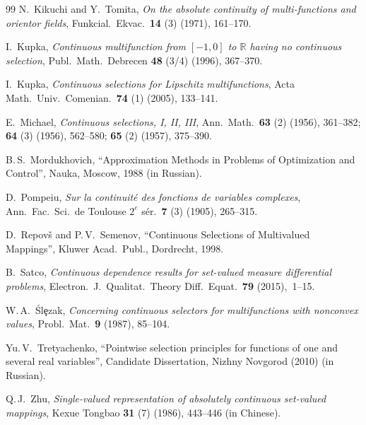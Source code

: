 \documentclass[preprint,12pt]{elsarticle}
\newcommand{\Rb}{\mathbb{R}}  \newcommand{\Nb}{\mathbb{N}}
\begin{document}
\begin{thebibliography}{99}
N.~Kikuchi and Y.~Tomita,
{\it On the absolute continuity of multi-functions and orientor fields},
Funkcial.\ Ekvac.\ {\bf 14} (3) (1971), 161--170.

I.~Kupka,
{\it Continuous multifunction from $[-1,0]$ to $\Rb$ having no continuous selection},
Publ.\ Math.\ Debrecen {\bf 48} (3/4) (1996), 367--370.

I.~Kupka,
{\it Continuous selections for Lipschitz multifunctions},
Acta Math.\ Univ.\ Comenian.\ {\bf 74} (1) (2005), 133--141.

E.~Michael, {\it Continuous selections, I, II, III},
Ann.\ Math.\ {\bf 63} (2) (1956), 361--382; {\bf 64} (3) (1956), 562--580;
  {\bf 65} (2) (1957), 375--390.

B.\,S.~Mordukhovich,
``Approximation Methods in Problems of Optimization and Control'',
Nauka, Moscow, 1988 (in Russian).

D.~Pompeiu,
{\it Sur la continuit{\'e} des fonctions de variables complexes},
Ann.\ Fac.\ Sci.\ de Toulouse $2^e$ s{\'e}r.\ {\bf 7} (3) (1905), 265--315.

D.~Repov{\v s} and P.\,V.~Semenov,
``Continuous Selections of Multivalued Mappings'',
Kluwer Acad.\ Publ., Dordrecht, 1998.

B.~Satco,
{\it Continuous dependence results for set-valued measure differential problems},
Electron.\ J.\ Qualitat.\ Theory Diff.\ Equat.\ {\bf 79} (2015),~1--15.

W.\,A.~{\'S}l{\c e}zak,
{\it Concerning continuous selectors for multifunctions with nonconvex values},
Probl.\ Mat.\ {\bf 9} (1987), 85--104.

Yu.\,V.~Tretyachenko,
``Pointwise selection principles for functions of one and several real variables'',
Candidate Dissertation, Nizhny Novgorod (2010) (in Russian).

Q.\,J.~Zhu,
{\it Single-valued representation of absolutely continuous set-valued mappings},
Kexue Tongbao {\bf 31} (7) (1986), 443--446 (in Chinese).

\end{thebibliography}
\end{document}
